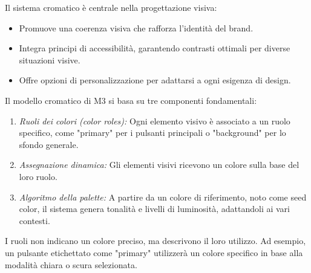 Il sistema cromatico è centrale nella progettazione visiva:
\begin{itemize}
    \item Promuove una coerenza visiva che rafforza l'identità del brand.
    \item Integra principi di accessibilità, garantendo contrasti ottimali per diverse situazioni visive.
    \item Offre opzioni di personalizzazione per adattarsi a ogni esigenza di design.
\end{itemize}
Il modello cromatico di M3 si basa su tre componenti fondamentali:
\begin{enumerate}
    \item \textit{Ruoli dei colori (color roles):} Ogni elemento visivo è associato a un ruolo specifico, come "primary" per i pulsanti principali o "background" per lo sfondo generale.
    \item \textit{Assegnazione dinamica:} Gli elementi visivi ricevono un colore sulla base del loro ruolo.
    \item \textit{Algoritmo della palette:} A partire da un colore di riferimento, noto come seed color, il sistema genera tonalità e livelli di luminosità, adattandoli ai vari contesti.
\end{enumerate}
I ruoli non indicano un colore preciso, ma descrivono il loro utilizzo. Ad esempio, un pulsante etichettato come "primary" utilizzerà un colore specifico in base alla modalità chiara o scura selezionata.

